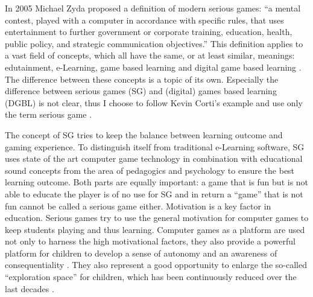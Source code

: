 In 2005 Michael Zyda proposed a definition of modern serious games: ``a mental
contest, played with a computer in accordance with specific rules, that uses
entertainment to further government or corporate training, education, health,
public policy, and strategic communication objectives.'' \cite{Zyda2005} This
definition applies to a vast field of concepts, which all have the same, or at
least similar, meanings: edutainment, e-Learning, game based learning and digital
game based learning \cite{Susi2007}. The difference between these concepts is
a topic of its own. Especially the difference between serious games (SG) and
(digital) games based learning (DGBL) is not clear, thus I choose to follow
Kevin Corti's example and use only the term serious game \cite{Corti2006}.


The concept of SG tries to keep the balance between learning outcome and gaming
experience. To distinguish itself from traditional e-Learning software, SG uses
state of the art computer game technology in combination with educational
sound concepts from the area of pedagogics and psychology to ensure the best
learning outcome. Both parts are equally important: a game that is fun but
is not able to educate the player is of no use for SG and in return a ``game''
that is not fun cannot be called a serious game either. Motivation is a
key factor in education. Serious games try to use the general motivation for
computer games to keep students playing and thus learning. Computer games as a
platform are used not only to harness the high motivational factors, they also
provide a powerful platform for children to develop a sense of autonomy and an
awareness of consequentiality \cite{Barab2005}. They also represent a good
opportunity to enlarge the so-called ``exploration space'' for
children, which has been continuously reduced over the last decades
\cite{Barab2005}.



